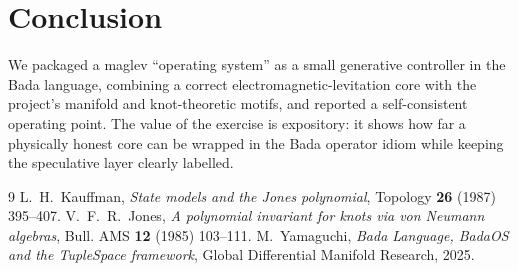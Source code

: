 \documentclass[11pt]{article}
\begin{document}
\section{Conclusion}
We packaged a maglev ``operating system'' as a small generative controller in
the Bada language, combining a correct electromagnetic-levitation core with the
project's manifold and knot-theoretic motifs, and reported a self-consistent
operating point. The value of the exercise is expository: it shows how far a
physically honest core can be wrapped in the Bada operator idiom while keeping
the speculative layer clearly labelled.

\begin{thebibliography}{9}
 L.~H.~Kauffman, \emph{State models and the Jones polynomial},
Topology \textbf{26} (1987) 395--407.
 V.~F.~R.~Jones, \emph{A polynomial invariant for knots via von
Neumann algebras}, Bull. AMS \textbf{12} (1985) 103--111.
 M.~Yamaguchi, \emph{Bada Language, BadaOS and the TupleSpace
framework}, Global Differential Manifold Research, 2025.
\end{thebibliography}
\end{document}
